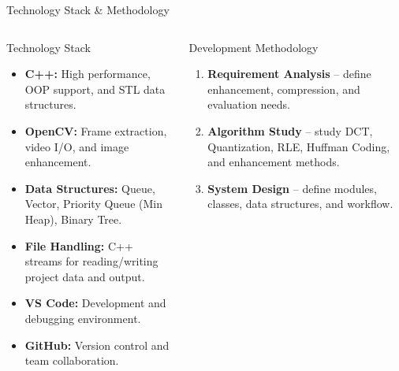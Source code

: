 \documentclass[aspectratio=169,11pt]{beamer}
\begin{document}
\begin{frame}{Technology Stack \& Methodology}

\begin{columns}[T,totalwidth=\textwidth]


\begin{block}{Technology Stack}

\tiny

\begin{itemize}

\setlength{\itemsep}{0.5pt}

\item
\textbf{C++:}
High performance, OOP support, and STL data structures.

\item
\textbf{OpenCV:}
Frame extraction, video I/O, and image enhancement.

\item
\textbf{Data Structures:}
Queue, Vector, Priority Queue (Min Heap), Binary Tree.

\item
\textbf{File Handling:}
C++ streams for reading/writing project data and output.

\item
\textbf{VS Code:}
Development and debugging environment.

\item
\textbf{GitHub:}
Version control and team collaboration.

\end{itemize}

\end{block}



\begin{block}{Development Methodology}

\tiny

\begin{enumerate}

\setlength{\itemsep}{0.5pt}

\item
\textbf{Requirement Analysis}
-- define enhancement, compression, and evaluation needs.

\item
\textbf{Algorithm Study}
-- study DCT, Quantization, RLE, Huffman Coding, and enhancement methods.

\item
\textbf{System Design}
-- define modules, classes, data structures, and workflow.


\end{enumerate}
\end{block}
\end{columns}
\end{frame}
\end{document}
